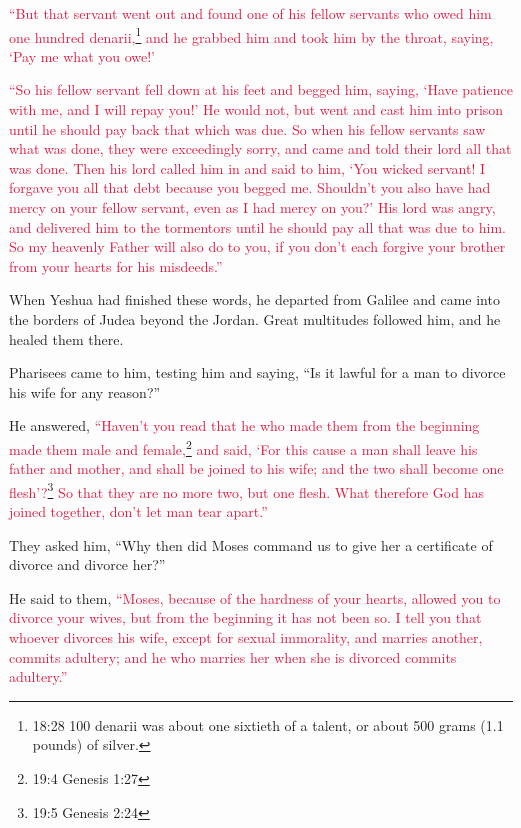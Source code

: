 \myverse{}\textcolor{crimson}{“But that servant went out and found one of his fellow servants
	who owed him one hundred denarii,}\footnote{18:28 100 denarii was about one sixtieth of a talent, or about 500 grams (1.1 pounds) of silver.}
\textcolor{crimson}{and he grabbed him and took him by the throat, saying, ‘Pay me what you owe!’}

\myverse{}\textcolor{crimson}{“So his fellow servant fell down at his feet and begged
	him, saying, ‘Have patience with me, and I will repay you!’
}
\myverse{}\textcolor{crimson}{He would not, but went and cast him into prison until he should pay back
	that which was due.
}
\myverse{}\textcolor{crimson}{So when his fellow servants saw what was done, they were exceedingly
	sorry, and came and told their lord all that was done.
}
\myverse{}\textcolor{crimson}{Then his lord called him in and said to him, ‘You wicked servant! I forgave
	you all that debt because you begged me.
}
\myverse{}\textcolor{crimson}{Shouldn’t you also have had mercy on your fellow servant, even as I had
	mercy on you?’
}
\myverse{}\textcolor{crimson}{His lord was angry, and delivered him to the tormentors until he should
	pay all that was due to him.
}
\myverse{}\textcolor{crimson}{So my heavenly Father will also do to you, if you don’t each forgive
	your brother from your hearts for his misdeeds.”}


\mychapter{} \myverse*{}When Yeshua had finished these words, he departed from Galilee
and came into the borders of Judea beyond the Jordan.
\myverse{}Great multitudes followed him, and he healed them there.

\myverse{}Pharisees came to him, testing him and saying, “Is it lawful for
a man to divorce his wife for any reason?”

\myverse{}He answered,
\textcolor{crimson}{“Haven’t you read that he who made them from the beginning made them male and female,}\footnote{19:4 Genesis 1:27}
\myverse{}\textcolor{crimson}{and said, ‘For this cause a man shall leave his father and mother, and
	shall be joined to his wife; and the two shall become one flesh’?}\footnote{19:5 Genesis 2:24}
\myverse{}\textcolor{crimson}{So that they are no more two, but one flesh. What therefore God has joined
	together, don’t let man tear apart.”}

\myverse{}They asked him, “Why then did Moses command us to give her a certificate
of divorce and divorce her?”

\myverse{}He said to them,
\textcolor{crimson}{“Moses, because of the hardness of your hearts, allowed you to divorce your wives, but from the beginning
	it has not been so.
}
\myverse{}\textcolor{crimson}{I tell you that whoever divorces his wife, except for sexual immorality,
	and marries another, commits adultery; and he who marries her when she is divorced commits adultery.”}

